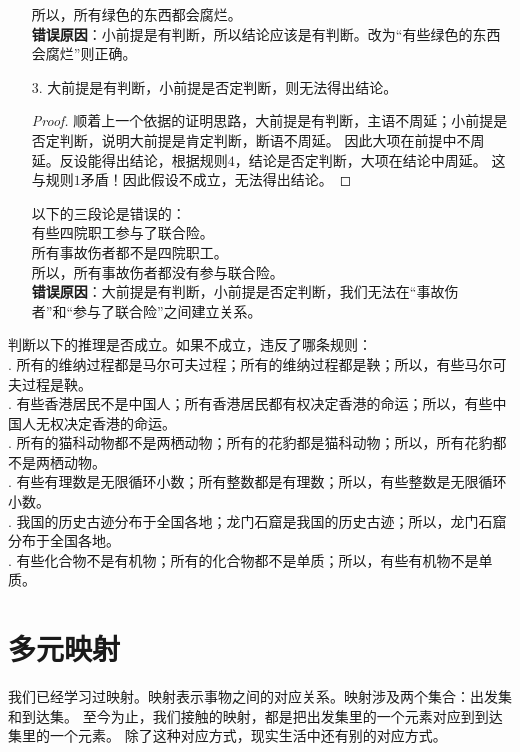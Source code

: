 \documentclass[12pt,UTF8]{ctexbook}
\begin{document}
\begin{enumerate}
\begin{ex*}
        \indent 所以，所有绿色的东西都会腐烂。\\
        \textbf{错误原因}：小前提是有判断，所以结论应该是有判断。改为“有些绿色的东西会腐烂”则正确。
    \end{ex*}
    \item[3.] 大前提是有判断，小前提是否定判断，则无法得出结论。
    \begin{proof}
        顺着上一个依据的证明思路，大前提是有判断，主语不周延；小前提是否定判断，说明大前提是肯定判断，断语不周延。
        因此大项在前提中不周延。反设能得出结论，根据规则$4$，结论是否定判断，大项在结论中周延。
        这与规则$1$矛盾！因此假设不成立，无法得出结论。
    \end{proof}
    \begin{ex*}
        以下的三段论是错误的： \\
        \indent 有些四院职工参与了联合险。\\
        \indent 所有事故伤者都不是四院职工。\\
        \indent 所以，所有事故伤者都没有参与联合险。\\
        \textbf{错误原因}：大前提是有判断，小前提是否定判断，我们无法在“事故伤者”和“参与了联合险”之间建立关系。
    \end{ex*}
\end{enumerate}
\begin{xt}\label{xt:4-1-10}
    判断以下的推理是否成立。如果不成立，违反了哪条规则：\\
    . 所有的维纳过程都是马尔可夫过程；所有的维纳过程都是鞅；所以，有些马尔可夫过程是鞅。\\
    . 有些香港居民不是中国人；所有香港居民都有权决定香港的命运；所以，有些中国人无权决定香港的命运。\\
    . 所有的猫科动物都不是两栖动物；所有的花豹都是猫科动物；所以，所有花豹都不是两栖动物。\\
    . 有些有理数是无限循环小数；所有整数都是有理数；所以，有些整数是无限循环小数。\\
    . 我国的历史古迹分布于全国各地；龙门石窟是我国的历史古迹；所以，龙门石窟分布于全国各地。\\
    . 有些化合物不是有机物；所有的化合物都不是单质；所以，有些有机物不是单质。    
\end{xt}

\chapter{多元映射}
我们已经学习过映射。映射表示事物之间的对应关系。映射涉及两个集合：出发集和到达集。
至今为止，我们接触的映射，都是把出发集里的一个元素对应到到达集里的一个元素。
除了这种对应方式，现实生活中还有别的对应方式。
\end{document}
